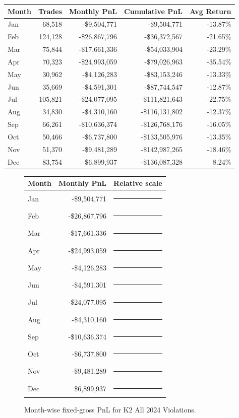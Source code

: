 \documentclass[11pt]{article}
\begin{document}
\begin{center}
\begin{tabular}{@{}lrrrr@{}}
\toprule
Month & Trades & Monthly PnL & Cumulative PnL & Avg Return \\
\midrule
Jan & 68,518 & -\$9,504,771 & -\$9,504,771 & -13.87\% \\
Feb & 124,128 & -\$26,867,796 & -\$36,372,567 & -21.65\% \\
Mar & 75,844 & -\$17,661,336 & -\$54,033,904 & -23.29\% \\
Apr & 70,323 & -\$24,993,059 & -\$79,026,963 & -35.54\% \\
May & 30,962 & -\$4,126,283 & -\$83,153,246 & -13.33\% \\
Jun & 35,669 & -\$4,591,301 & -\$87,744,547 & -12.87\% \\
Jul & 105,821 & -\$24,077,095 & -\$111,821,643 & -22.75\% \\
Aug & 34,830 & -\$4,310,160 & -\$116,131,802 & -12.37\% \\
Sep & 66,261 & -\$10,636,374 & -\$126,768,176 & -16.05\% \\
Oct & 50,466 & -\$6,737,800 & -\$133,505,976 & -13.35\% \\
Nov & 51,370 & -\$9,481,289 & -\$142,987,265 & -18.46\% \\
Dec & 83,754 & \$6,899,937 & -\$136,087,328 & 8.24\% \\
\bottomrule
\end{tabular}
\end{center}

\begin{figure}[h]
\centering
\begin{tabular}{@{}lrl@{}}
\toprule
Month & Monthly PnL & Relative scale \\
\midrule
Jan & -\$9,504,771 & \textcolor{red}{\rule{3.5cm}{7pt}}\\
Feb & -\$26,867,796 & \textcolor{red}{\rule{10.0cm}{7pt}}\\
Mar & -\$17,661,336 & \textcolor{red}{\rule{6.6cm}{7pt}}\\
Apr & -\$24,993,059 & \textcolor{red}{\rule{9.3cm}{7pt}}\\
May & -\$4,126,283 & \textcolor{red}{\rule{1.5cm}{7pt}}\\
Jun & -\$4,591,301 & \textcolor{red}{\rule{1.7cm}{7pt}}\\
Jul & -\$24,077,095 & \textcolor{red}{\rule{9.0cm}{7pt}}\\
Aug & -\$4,310,160 & \textcolor{red}{\rule{1.6cm}{7pt}}\\
Sep & -\$10,636,374 & \textcolor{red}{\rule{4.0cm}{7pt}}\\
Oct & -\$6,737,800 & \textcolor{red}{\rule{2.5cm}{7pt}}\\
Nov & -\$9,481,289 & \textcolor{red}{\rule{3.5cm}{7pt}}\\
Dec & \$6,899,937 & \textcolor{green!50!black}{\rule{2.6cm}{7pt}}\\
\bottomrule
\end{tabular}
\caption{Month-wise fixed-gross PnL for K2 All 2024 Violations.}
\end{figure}
\end{document}
